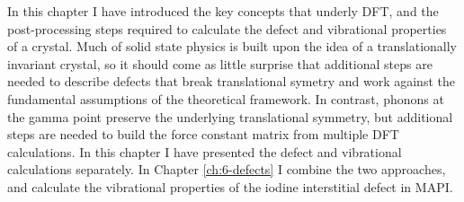 In this chapter I have introduced the key concepts that underly DFT, and the post-processing steps required to calculate the defect and vibrational properties of a crystal. 
Much of solid state physics is built upon the idea of a translationally invariant crystal, so it should come as little surprise that additional steps are needed to describe defects that break translational symetry and work against the fundamental assumptions of the theoretical framework.
In contrast, phonons at the gamma point preserve the underlying translational symmetry, but additional steps are needed to build the force constant matrix from multiple DFT calculations.
In this chapter I have presented the defect and vibrational calculations separately. In Chapter \ref{ch:6-defects} I combine the two approaches, and calculate the vibrational properties of the iodine interstitial defect in MAPI. 


